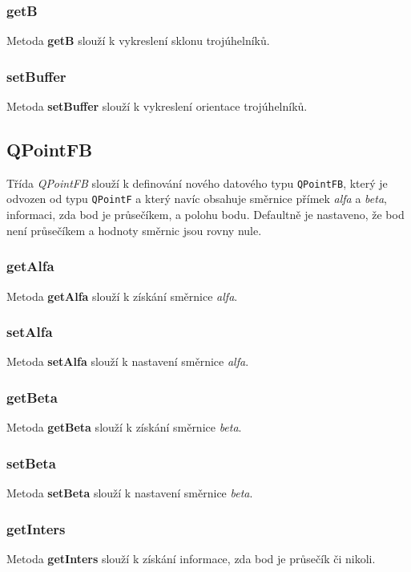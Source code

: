 \documentclass[a4paper, 12pt]{article}
\begin{document}
\subsubsection*{getB}
Metoda \textbf{getB} slouží k vykreslení sklonu trojúhelníků.

\subsubsection*{setBuffer}
Metoda \textbf{setBuffer} slouží k vykreslení orientace trojúhelníků.


\subsection{QPointFB}
Třída \textit{QPointFB} slouží k definování nového datového typu \texttt{QPointFB}, který je odvozen od typu \texttt{QPointF} a který navíc obsahuje směrnice přímek \textsl{alfa} a \textsl{beta}, informaci, zda bod je průsečíkem, a polohu bodu. Defaultně je nastaveno, že bod není průsečíkem a hodnoty směrnic jsou rovny nule.

\subsubsection*{getAlfa}
Metoda \textbf{getAlfa} slouží k získání směrnice \textsl{alfa}.

\subsubsection*{setAlfa}
Metoda \textbf{setAlfa} slouží k nastavení směrnice \textsl{alfa}. 

\subsubsection*{getBeta}
Metoda \textbf{getBeta} slouží k získání směrnice \textsl{beta}.

\subsubsection*{setBeta}
Metoda \textbf{setBeta} slouží k nastavení směrnice \textsl{beta}. 

\subsubsection*{getInters}
Metoda \textbf{getInters} slouží k získání informace, zda bod je průsečík či nikoli.
\end{document}
